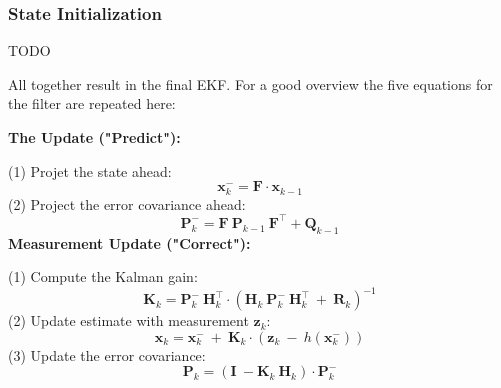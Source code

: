 \subsubsection{State Initialization}
TODO

All together result in the final EKF. For a good overview the five equations for the filter are repeated here:

\textbf{The Update ("Predict"):}

(1) Projet the state ahead:
\begin{equation}
\mathbf{x}_k^- = \mathbf{F} \cdot \mathbf{x}_{k-1}
\end{equation}
(2) Project the error covariance ahead:
\begin{equation}
\mathbf{P}_k^- = \mathbf{F}\ \mathbf{P}_{k-1}\ \mathbf{F}^\intercal + \mathbf{Q}_{k-1}
\end{equation}
\textbf{Measurement Update ("Correct"):}

(1) Compute the Kalman gain:
\begin{equation}
\mathbf{K}_k = \mathbf{P}_k^-\ \mathbf{H}_k^\intercal\cdot (\mathbf{H}_k\ \mathbf{P}_k^-\ \mathbf{H}_k^\intercal \ + \ \mathbf{R}_k)^{-1} 
\end{equation}
(2) Update estimate with measurement $\mathbf{z}_k$:
\begin{equation}
\mathbf{x}_k = \mathbf{x}_k^- \ + \ \mathbf{K}_k\cdot (\mathbf{z}_k \ - \ h(\mathbf{x}_k^-))
\end{equation} 
(3) Update the error covariance:
\begin{equation}
\mathbf{P}_k = (\mathbf{I} \ - \mathbf{K}_k\ \mathbf{H}_k)\cdot \mathbf{P}_k^-
\end{equation}
